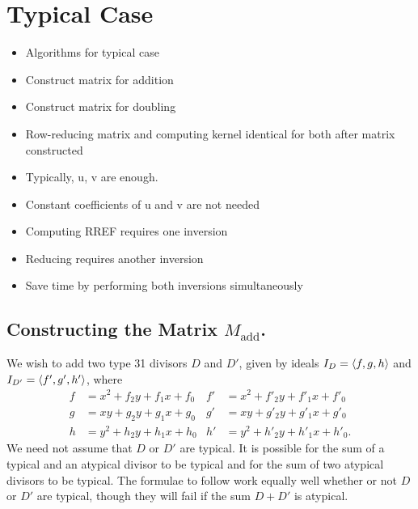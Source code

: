 
\section{Typical Case}
\label{chap_typical_case}

\begin{itemize}
  \item Algorithms for typical case
  \item Construct matrix for addition
  \item Construct matrix for doubling
  \item Row-reducing matrix and computing kernel identical for both after matrix constructed
  \item Typically, u, v are enough.
  \item Constant coefficients of u and v are not needed
  \item Computing RREF requires one inversion
  \item Reducing requires another inversion
  \item Save time by performing both inversions simultaneously
\end{itemize}


\subsection{Constructing the Matrix $M_{\text{add}}$.}

We wish to add two type 31 divisors $D$ and $D'$,
given by ideals $I_D = \left\langle f,g,h \right\rangle$ and $I_{D'} = \left\langle f',g',h' \right\rangle$, where
\begin{align*}
  f &= x^2 + f_2y + f_1x + f_0 & f' &= x^2 + f'_2y + f'_1x + f'_0 \\
  g &=  xy + g_2y + g_1x + g_0 & g' &=  xy + g'_2y + g'_1x + g'_0 \\
  h &= y^2 + h_2y + h_1x + h_0 & h' &= y^2 + h'_2y + h'_1x + h'_0.
\end{align*}
We need not assume that $D$ or $D'$ are typical.
It is possible for the sum of a typical and an atypical divisor to be typical
and for the sum of two atypical divisors to be typical.
The formulae to follow work equally well whether or not $D$ or $D'$ are typical,
though they will fail if the sum $D + D'$ is atypical.

